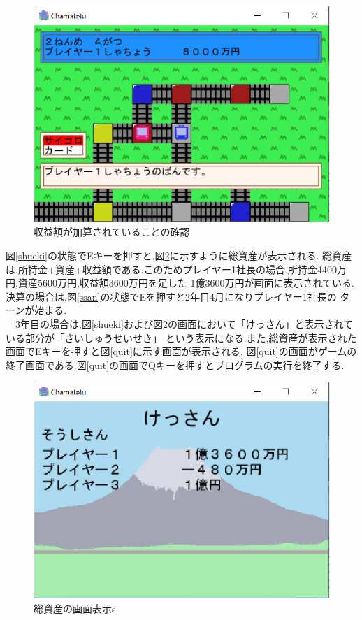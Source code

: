 \documentclass[a4j]{jarticle}
\begin{document}
    \begin{figure}[H]
        \centering
        \includegraphics[scale=1.3]{yorozu.eps}
        \caption{収益額が加算されていることの確認}
         \label{yorozu}
        \end{figure}

        図\ref{shueki}の状態でEキーを押すと,図\ref{sisan}に示すように総資産が表示される.
        総資産は,所持金+資産+収益額である.このためプレイヤー1社長の場合,所持金4400万円,資産5600万円,収益額3600万円を足した
        1億3600万円が画面に表示されている.決算の場合は,図\ref{ssan}の状態でEを押すと2年目4月になりプレイヤー1社長の
        ターンが始まる.\\
        　3年目の場合は,図\ref{shueki}および図\ref{sisan}の画面において「けっさん」と表示されている部分が「さいしゅうせいせき」
        という表示になる.また,総資産が表示された画面でEキーを押すと図\ref{quit}に示す画面が表示される.
        図\ref{quit}の画面がゲームの終了画面である.図\ref{quit}の画面でQキーを押すとプログラムの実行を終了する.
        

    \begin{figure}[H]
        \centering
        \includegraphics[scale=1.3]{sisan.eps}
        \caption{総資産の画面表示s}
         \label{sisan}
        \end{figure}
\end{document}
